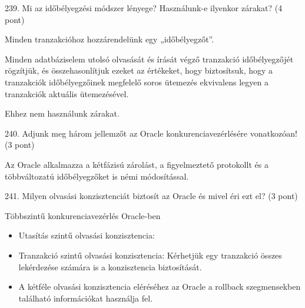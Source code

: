 \documentclass[a4paper,11.5pt, table]{article}
\begin{document}
239. Mi az időbélyegzési módszer lényege? Használunk-e ilyenkor zárakat? (4 pont)
	\begin{compactitem}
		\item Minden tranzakcióhoz hozzárendelünk egy „időbélyegzőt”. 
		\item Minden adatbáziselem utolsó olvasását és írását végző tranzakció időbélyegzőjét rögzítjük, és összehasonlítjuk ezeket az értékeket, hogy biztosítsuk, hogy a tranzakciók időbélyegzőinek megfelelő soros ütemezés ekvivalens legyen a tranzakciók aktuális ütemezésével.
		\item Ehhez nem használunk zárakat.
	\end{compactitem}		

240. Adjunk meg három jellemzőt az Oracle konkurenciavezérlésére vonatkozóan! (3 pont)
	\begin{compactitem}
		\item Az Oracle alkalmazza a kétfázisú zárolást, a figyelmeztető protokollt és a többváltozatú időbélyegzőket is némi módosítással.
	\end{compactitem}

241. Milyen olvasási konzisztenciát biztosít az Oracle és mivel éri ezt el? (3 pont)
	\begin{compactitem}
		\item Többszintű konkurenciavezérlés Oracle-ben
		\begin{itemize}
			\item Utasítás szintű olvasási konzisztencia:
			
			\item Tranzakció szintű olvasási konzisztencia: Kérhetjük egy tranzakció összes lekérdezése számára is a konzisztencia biztosítását. 
		
			\item A kétféle olvasási konzisztencia eléréséhez az Oracle a rollback szegmensekben található információkat használja fel. 		
		\end{itemize}
	\end{compactitem}
\end{document}
